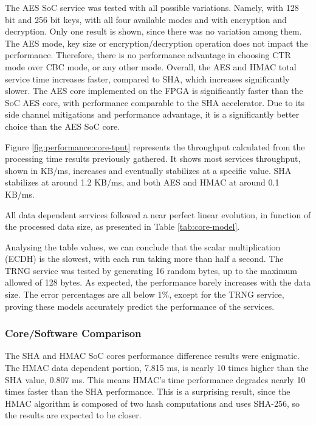 The AES SoC service was tested with all possible variations. Namely, with 128 bit and 256 bit keys, with all four available modes and with encryption and decryption. Only one result is shown, since there was no variation among them. The AES mode, key size or encryption/decryption operation does not impact the performance. Therefore, there is no performance advantage in choosing CTR mode over CBC mode, or any other mode.
Overall, the AES and HMAC total service time increases faster, compared to SHA, which increases significantly slower.
The AES core implemented on the FPGA is significantly faster than the SoC AES core, with performance comparable to the SHA accelerator. Due to its side channel mitigations and performance advantage, it is a significantly better choice than the AES SoC core.

Figure \ref{fig:performance:core-tput} represents the throughput calculated from the processing time results previously gathered. It shows most services throughput, shown in KB/ms, increases and eventually stabilizes at a specific value. SHA stabilizes at around 1.2 KB/ms, and both AES and HMAC at around 0.1 KB/ms.

All data dependent services followed a near perfect linear evolution, in function of the processed data size, as presented in Table \ref{tab:core-model}.

Analysing the table values, we can conclude that the scalar multiplication (ECDH) is the slowest, with each run taking more than half a second.
The TRNG service was tested by generating 16 random bytes, up to the maximum allowed of 128 bytes. As expected, the performance barely increases with the data size.
The error percentages are all below 1\%, except for the TRNG service, proving these models accurately predict the performance of the services.

\subsubsection*{Core/Software Comparison}\label{chap:evaluation:services:software}

The SHA and HMAC SoC cores performance difference results were enigmatic. The HMAC data dependent portion, 7.815 ms, is nearly 10 times higher than the SHA value, 0.807 ms. This means HMAC's time performance degrades nearly 10 times faster than the SHA performance. This is a surprising result, since the HMAC algorithm is composed of two hash computations and uses SHA-256, so the results are expected to be closer.

